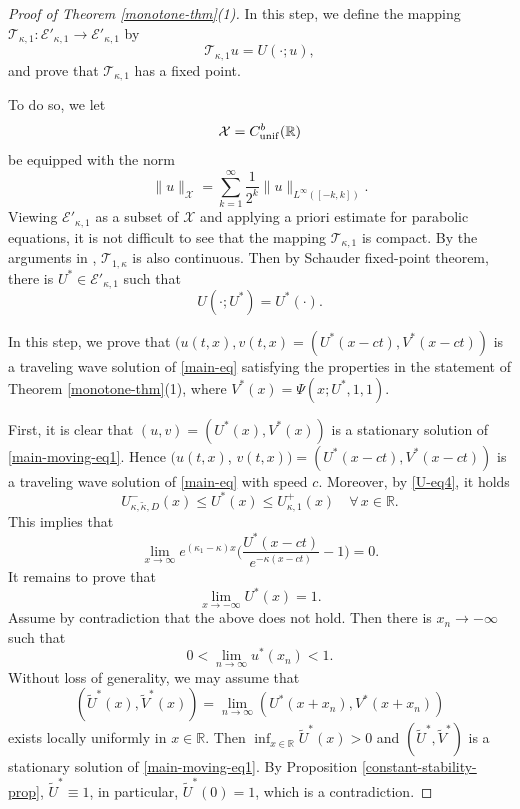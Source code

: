\documentclass[11pt]{article} %
\theoremstyle{remark}
\theoremstyle{remark}
\numberwithin{equation}{section}
\numberwithin{figure}{section}
\numberwithin{table}{section}
\newcommand\RR{\ensuremath{\mathbb{R}}}
\begin{document}
\begin{proof}[Proof of Theorem \ref{monotone-thm}(1)]
 In this step, we define 
the mapping $\mathcal{T}_{\kappa,1}:\mathcal{E}'_{\kappa,1}\to \mathcal{E}'_{\kappa,1}$ by 
$$
\mathcal{T}_{\kappa,1} u=U(\cdot;u),
$$
and  prove that $\mathcal{T}_{\kappa,1}$ has a fixed point.


\smallskip

To do so, we let
$$
\mathcal{X}=C_{\rm unif}^b(\RR)
$$
be equipped with the norm
$$
\|u\|_{\mathcal{X}}=\sum_{k=1}^\infty \frac{1}{2^k}\|u\|_{L^\infty([-k,k])}.
$$
Viewing $\mathcal{E}'_{\kappa,1}$ as a subset of $\mathcal{X}$ and applying a priori estimate for parabolic equations, it is not difficult to see that the mapping $\mathcal{T}_{\kappa,1}$ is compact. 
By the arguments in \cite[Theorem 3.1]{SaSh2017-1}, $\mathcal{T}_{1,\kappa}$ is also continuous. Then by 
Schauder fixed-point theorem, there is $U^*\in\mathcal{E}'_{\kappa,1}$ such that
$$
U(\cdot;U^*)=U^*(\cdot).
$$


\smallskip


 In this step, we prove that
$(u(t,x),v(t,x)=(U^*(x-ct), V^*(x-ct))$ is a traveling wave solution of \eqref{main-eq} satisfying the properties in the statement of 
Theorem \ref{monotone-thm}(1), where $V^*(x)=\Psi(x;U^*,1,1)$.

\smallskip

First,  it is clear that $(u,v)=(U^*(x),V^*(x))$ is a stationary solution of \eqref{main-moving-eq1}. Hence
$(u(t,x)$, $v(t,x))=(U^*(x-ct),V^*(x-ct))$ is a traveling wave solution of \eqref{main-eq} with speed $c$.
Moreover, by \eqref{U-eq4}, it holds 
\begin{equation*}
U_{\kappa,\tilde\kappa,D}^-(x)\le U^*(x)\le U_{\kappa,1}^+(x)\quad \forall\, x\in\RR.
\end{equation*}
This implies that
$$
\lim_{x\to\infty} e^{(\kappa_1-\kappa)x} \Big(\frac{U^*(x-ct)}{e^{-\kappa(x-ct)}}-1\Big)=0.
$$
 It remains to prove that
$$
\lim_{x\to -\infty} U^*(x)=1.
$$
Assume by contradiction that the above does not hold. Then there is $x_n\to -\infty$ such that
$$
0<\lim_{n\to\infty} u^*(x_n)<1.
$$
Without loss of generality, we may assume that
$$
(\widetilde U^*(x),\widetilde V^*(x))=\lim_{n\to\infty} (U^*(x+x_n), V^*(x+x_n))
$$
exists locally uniformly in $x\in\RR$. Then $\inf_{x\in\RR} \widetilde U^*(x)>0$ and
$(\widetilde U^*,\widetilde V^*)$ is a stationary solution of \eqref{main-moving-eq1}. By Proposition
\ref{constant-stability-prop}, $\widetilde U^*\equiv 1$, in particular,
$\widetilde U^*(0)=1$, which is a contradiction.
\end{proof}
\end{document}
